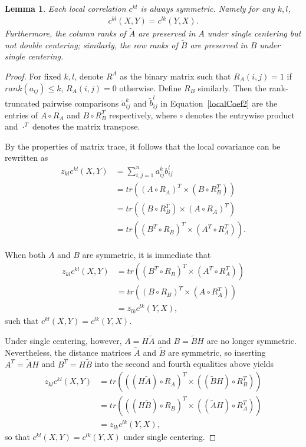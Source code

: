 \documentclass[11pt]{article}
\providecommand{\mt}[1]{\widetilde{#1}}
\newcommand{\G}{c}
\newtheorem{appLem}{Lemma}
\begin{document}
\begin{appLem}
Each local correlation $\G^{kl}$ is always symmetric. Namely for any $k,l$, 
\begin{align*}
\G^{kl}(X,Y)=\G^{lk}(Y,X).
\end{align*}
Furthermore, the column ranks of $\tilde{A}$ are preserved in $A$ under single centering but not double centering; similarly, the row ranks of $\tilde{B}$ are preserved in $B$ under single centering.
\end{appLem}
\begin{proof}
For fixed $k,l$, denote $R^{A}$ as the binary matrix such that $R_{A}(i,j)=1$ if $rank(a_{ij}) \leq k$, $R_{A}(i,j)=0$ otherwise. Define $R_{B}$ similarly. Then the rank-truncated pairwise comparisons $\mt{a}_{ij}^k$ and $\mt{b}_{ij}^l$ in Equation~\ref{localCoef2} are the entries of $A \circ R_{A}$ and $B \circ R_{B}^{T}$ respectively, where $\circ$ denotes the entrywise product and $\cdot^{T}$ denotes the matrix transpose.

By the properties of matrix trace, it follows that the local covariance can be rewritten as
\begin{align*}
z_{kl} \G^{kl}(X,Y) &= \textstyle \sum_{i,j=1}^n a_{ij}^k b_{ij}^l \\
 &= tr((A \circ R_{A})^{T} \times (B \circ R_{B}^{T})) \\
 &= tr((B \circ R_{B}^{T}) \times (A \circ R_{A})^{T}) \\
 &= tr((B^{T} \circ R_{B})^{T} \times (A^{T} \circ R_{A}^{T})).
\end{align*}

When both $A$ and $B$ are symmetric, it is immediate that
\begin{align*}
z_{kl} \G^{kl}(X,Y) &= tr((B^{T} \circ R_{B})^{T} \times (A^{T} \circ R_{A}^{T})) \\
 &= tr((B \circ R_{B})^{T} \times (A \circ R_{A}^{T})) \\
 &= z_{lk} \G^{lk}(Y,X),
\end{align*}
such that $\G^{kl}(X,Y)=\G^{lk}(Y,X)$.

Under single centering, however, $A=H \tilde{A}$ and $B=\tilde{B}H$ are no longer symmetric. Nevertheless, the distance matrices $\tilde{A}$ and $\tilde{B}$ are symmetric, so inserting $A^{T}=\tilde{A}H$ and $B^{T}=H\tilde{B}$ into the second and fourth equalities above yields
\begin{align*}
z_{kl} \G^{kl}(X,Y) &= tr(((H \tilde{A}) \circ R_{A})^{T} \times ((\tilde{B}H) \circ R_{B}^{T})) \\
 &= tr(((H \tilde{B}) \circ R_{B})^{T} \times ((\tilde{A}H) \circ R_{A}^{T})) \\
 &= z_{lk} \G^{lk}(Y,X),
\end{align*}
so that $\G^{kl}(X,Y)=\G^{lk}(Y,X)$ under single centering.


\end{proof}
\end{document}
